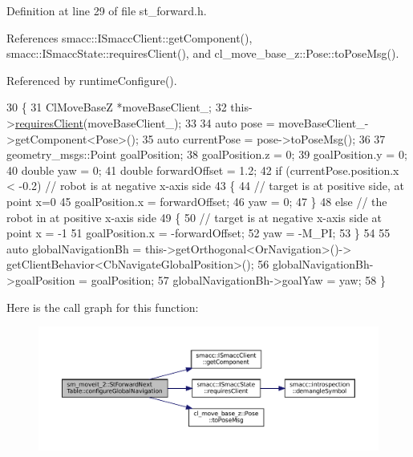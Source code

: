 Definition at line 29 of file st\+\_\+forward.\+h.



References smacc\+::\+I\+Smacc\+Client\+::get\+Component(), smacc\+::\+I\+Smacc\+State\+::requires\+Client(), and cl\+\_\+move\+\_\+base\+\_\+z\+::\+Pose\+::to\+Pose\+Msg().



Referenced by runtime\+Configure().


\begin{DoxyCode}
30   \{
31     ClMoveBaseZ *moveBaseClient\_;
32     this->\hyperlink{classsmacc_1_1ISmaccState_a7f95c9f0a6ea2d6f18d1aec0519de4ac}{requiresClient}(moveBaseClient\_);
33 
34     \textcolor{keyword}{auto} pose = moveBaseClient\_->getComponent<Pose>();
35     \textcolor{keyword}{auto} currentPose = pose->toPoseMsg();
36 
37     geometry\_msgs::Point goalPosition;
38     goalPosition.z = 0;
39     goalPosition.y = 0;
40     \textcolor{keywordtype}{double} yaw = 0;
41     \textcolor{keywordtype}{double} forwardOffset = 1.2;
42     \textcolor{keywordflow}{if} (currentPose.position.x < -0.2)  \textcolor{comment}{// robot is at negative x-axis side}
43     \{
44       \textcolor{comment}{// target is at positive side, at point x=0}
45       goalPosition.x = forwardOffset;
46       yaw = 0;
47     \}
48     \textcolor{keywordflow}{else}  \textcolor{comment}{// the robot in at positive x-axis side}
49     \{
50       \textcolor{comment}{// target is at negative x-axis side at point x = -1}
51       goalPosition.x = -forwardOffset;
52       yaw = -M\_PI;
53     \}
54 
55     \textcolor{keyword}{auto} globalNavigationBh = this->getOrthogonal<OrNavigation>()->
      getClientBehavior<CbNavigateGlobalPosition>();
56     globalNavigationBh->goalPosition = goalPosition;
57     globalNavigationBh->goalYaw = yaw;
58   \}
\end{DoxyCode}
Here is the call graph for this function\+:
\nopagebreak
\begin{figure}[H]
\begin{center}
\leavevmode
\includegraphics[width=350pt]{structsm__moveit__2_1_1StForwardNextTable_a79b062960dd4f3b75464f3e47b87d79c_cgraph}
\end{center}
\end{figure}
